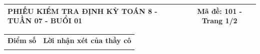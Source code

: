 \documentclass[12pt,a4paper]{article}
\begin{document}
\pagestyle{empty}
\noindent
\begin{tabularx}{\linewidth}{|X|c|}
\hline
\textbf{PHIẾU KIỂM TRA ĐỊNH KỲ TOÁN 8 - TUẦN 07 - BUỔI 01} & \textbf{Mã đề: 101 - Trang 1/2} \\
\hline
\end{tabularx}

\vspace{1.2mm}

\noindent
\begin{tabularx}{\linewidth}{|p{3.2cm}|X|}
\hline
\centering\textbf{Điểm số} & \centering\textbf{Lời nhận xét của thầy cô} \tabularnewline
\rule{0pt}{1.8cm} & \\
\hline
\end{tabularx}

\vspace{1.2mm}
\end{document}
